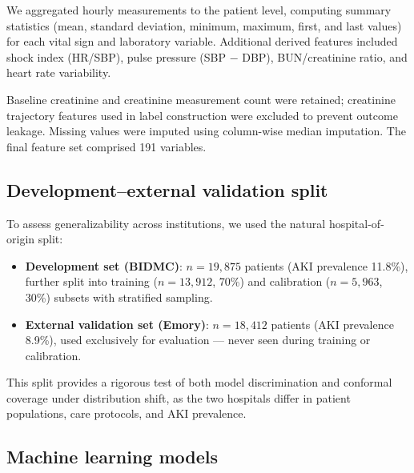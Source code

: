 \documentclass[12pt]{article}
\begin{document}
We aggregated hourly measurements to the patient level, computing
summary statistics (mean, standard deviation, minimum, maximum,
first, and last values) for each vital sign and laboratory
variable.  Additional derived features included shock index
(HR/SBP), pulse pressure (SBP $-$ DBP), BUN/creatinine ratio,
and heart rate variability.

Baseline creatinine and creatinine measurement count were
retained; creatinine trajectory features used in label
construction were excluded to prevent outcome leakage.  Missing
values were imputed using column-wise median imputation.  The
final feature set comprised 191 variables.

\subsection{Development--external validation split}
\label{sec:split}

To assess generalizability across institutions, we used the
natural hospital-of-origin split:
\begin{itemize}
\item \textbf{Development set (BIDMC)}: $n = 19{,}875$ patients
  (AKI prevalence 11.8\%), further split into training
  ($n = 13{,}912$, 70\%) and calibration ($n = 5{,}963$, 30\%)
  subsets with stratified sampling.
\item \textbf{External validation set (Emory)}:
  $n = 18{,}412$ patients (AKI prevalence 8.9\%), used
  exclusively for evaluation --- never seen during training
  or calibration.
\end{itemize}

This split provides a rigorous test of both model discrimination
and conformal coverage under distribution shift, as the two
hospitals differ in patient populations, care protocols, and AKI
prevalence.

\subsection{Machine learning models}
\label{sec:models}
\end{document}
